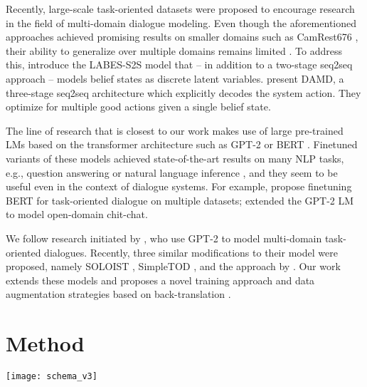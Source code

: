 \documentclass[11pt,a4paper]{article}
\newcommand{\augpt}[0]{AuGPT\xspace}
\begin{document}
Recently, large-scale task-oriented datasets were proposed \cite{budzianowski2018, byrne2019, rastogi2019} to encourage research in the field of multi-domain dialogue modeling. 
Even though the aforementioned approaches achieved promising results on smaller domains such as CamRest676 \cite{wen2016}, their ability to generalize over multiple domains remains limited \cite{zhang2019}. 
To address this, \citet{zhang2020end2end} introduce the LABES-S2S model that -- in addition to a two-stage seq2seq approach -- models belief states as discrete latent variables.
\citet{zhang2019} present DAMD, a three-stage seq2seq architecture which explicitly decodes the system action. They optimize for multiple good actions given a single belief state.


The line of research that is closest to our work makes use of large pre-trained LMs 
based on the transformer architecture \cite{vaswani2017} such as GPT-2 \cite{radford2019} or BERT \cite{devlin2019}. 
Finetuned variants of these models achieved state-of-the-art results on many NLP tasks, e.g., question answering or natural language inference \cite{liu2020},  
and they seem to be useful even in the context of dialogue systems. 
For example, \citet{wu2020} propose finetuning BERT \cite{devlin2019} for task-oriented dialogue on multiple datasets; 
\citet{zhang2020dialogpt} extended the GPT-2 LM to model open-domain chit-chat.

We follow research initiated by \citet{budzianowski2019}, who use GPT-2 to model multi-domain task-oriented dialogues.  
Recently, three similar modifications to their model were proposed, namely SOLOIST \cite{peng2020}, SimpleTOD \cite{hosseini2020}, and the approach by \citet{ham2020}. 
Our work extends these models and proposes a novel training approach and data augmentation strategies based on back-translation \cite{edunov2018,federmann2019multilingual}.

\section{Method}
\label{sec:method}

\begin{figure*}[htbp]
\centering
\texttt{[image: schema\_v3]} \caption{The architecture of \augpt. The pipeline runs in two stages. First, a finetuned GPT-2 LM is used to predict a belief. Then the database results are obtained and everything is passed to the GPT-2 again to predict a final delexicalized response, along with possible auxiliary tasks (belief consistency, intent classification, system action classification). Unlikelihood loss is used for response prediction training.}
\label{fig:pipeline}
\end{figure*}
\end{document}
